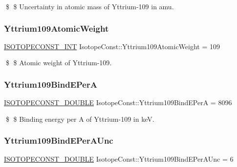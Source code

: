 \$ \$ Uncertainty in atomic mass of Yttrium-\/109 in amu. \mbox{\label{group___isotope_const-_yttrium-_y109_ga8750c6a6b274a131eb779ce35504f7db}} 
\subsubsection{\texorpdfstring{Yttrium109\+Atomic\+Weight}{Yttrium109AtomicWeight}}
{\footnotesize\ttfamily \mbox{\hyperlink{group___isotope_const-_macros_ga5f18360b3e99483a35c32d789e62621c}{I\+S\+O\+T\+O\+P\+E\+C\+O\+N\+S\+T\+\_\+\+I\+NT}} Isotope\+Const\+::\+Yttrium109\+Atomic\+Weight = 109}

\$ \$ Atomic weight of Yttrium-\/109. \mbox{\label{group___isotope_const-_yttrium-_y109_ga662783bbe25bd0d38b363ad889e5ae41}} 
\subsubsection{\texorpdfstring{Yttrium109\+Bind\+E\+PerA}{Yttrium109BindEPerA}}
{\footnotesize\ttfamily \mbox{\hyperlink{group___isotope_const-_macros_ga8f45a7272ce02c0b4c65c44636ed719a}{I\+S\+O\+T\+O\+P\+E\+C\+O\+N\+S\+T\+\_\+\+D\+O\+U\+B\+LE}} Isotope\+Const\+::\+Yttrium109\+Bind\+E\+PerA = 8096}

\$ \$ Binding energy per A of Yttrium-\/109 in keV. \mbox{\label{group___isotope_const-_yttrium-_y109_ga21c569dd22a5fb6862f28736c29247c6}} 
\subsubsection{\texorpdfstring{Yttrium109\+Bind\+E\+Per\+A\+Unc}{Yttrium109BindEPerAUnc}}
{\footnotesize\ttfamily \mbox{\hyperlink{group___isotope_const-_macros_ga8f45a7272ce02c0b4c65c44636ed719a}{I\+S\+O\+T\+O\+P\+E\+C\+O\+N\+S\+T\+\_\+\+D\+O\+U\+B\+LE}} Isotope\+Const\+::\+Yttrium109\+Bind\+E\+Per\+A\+Unc = 6}

